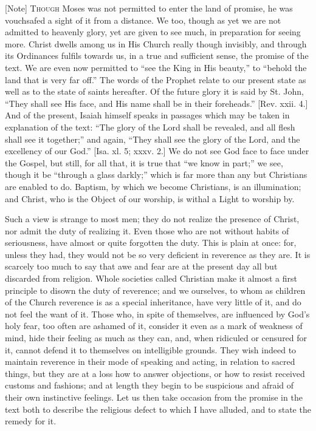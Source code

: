 [Note] T\textsc{hough} Moses was not
permitted to enter the land of promise, he was vouchsafed a sight of
it from a distance. We too, though as yet we are not admitted to
heavenly glory, yet are given to see much, in preparation for seeing
more. Christ dwells among us in His Church really though invisibly,
and through its Ordinances fulfils towards us, in a true and
sufficient sense, the promise of the text. We are even now permitted
to ``see the King in His beauty,'' to ``behold the land
that is very far off.'' The words of the Prophet relate to our
present state as well as to the state of saints hereafter. Of the
future glory it is said by St. John, ``They shall see His face,
and His name shall be in their foreheads.'' [Rev. xxii. 4.] And of
the present, Isaiah himself speaks in passages which may be taken in
explanation of the text: ``The glory of the Lord shall be
revealed, and all flesh shall see it together;'' and again,
``They shall see the glory of the Lord, and the excellency of our
God.'' [Isa. xl. 5; xxxv. 2.] We do not see God face to face under
the Gospel, but still, for all that, it is true that ``we know in
part;'' we see, though it be ``through a glass darkly;''
which is far more than any but Christians are enabled to do. Baptism,
by which we become Christians, is an illumination; and Christ, who is
the Object of our worship, is withal a Light to worship by.

Such a view is strange to most men; they do not realize the
presence of Christ, nor admit the duty of realizing it. Even those who
are not without habits of seriousness, have almost or quite forgotten
the duty. This is plain at once: for, unless they had, they would not
be so very deficient in reverence as they are. It is scarcely too much
to say that awe and fear are at the present day all but discarded from
religion. Whole societies called Christian make it almost a first
principle to disown the duty of reverence; and we ourselves, to whom
as children of the Church reverence is as a special inheritance, have
very little of it, and do not feel the want of it. Those who, in spite
of themselves, are influenced by God's holy fear, too often are
ashamed of it, consider it even as a mark of weakness of mind, hide
their feeling as much as they can, and, when ridiculed or censured for
it, cannot defend it to themselves on intelligible grounds. They wish
indeed to maintain reverence in their mode of speaking and acting, in
relation to sacred things, but they are at a loss how to answer
objections, or how to resist received customs and fashions; and at
length they begin to be suspicious and afraid of their own instinctive
feelings. Let us then take occasion from the promise in the text both
to describe the religious defect to which I have alluded, and to state
the remedy for it.


